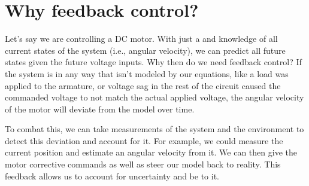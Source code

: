 \section{Why feedback control?}

Let's say we are controlling a DC motor. With just a
 and knowledge of all current \glspl{state}
of the \gls{system} (i.e., angular velocity), we can predict all future
\glspl{state} given the future voltage \glspl{input}. Why then do we need
feedback control? If the \gls{system} is  in any
way that isn't modeled by our equations, like a load was applied to the
armature, or voltage sag in the rest of the circuit caused the commanded voltage
to not match the actual applied voltage, the angular velocity of the motor will
deviate from the \gls{model} over time.

To combat this, we can take measurements of the \gls{system} and the environment
to detect this deviation and account for it. For example, we could measure the
current position and estimate an angular velocity from it. We can then give the
motor corrective commands as well as steer our \gls{model} back to reality. This
feedback allows us to account for uncertainty and be
 to it.
